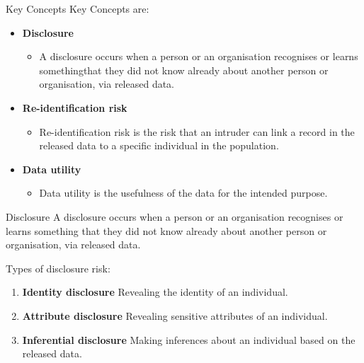 \documentclass[
	11pt, %
]{beamer}
\begin{document}
\begin{frame}{Key Concepts}
\label{key-concepts}
Key Concepts are:

\begin{itemize}
\tightlist
\item
  \textbf{Disclosure}

  \begin{itemize}
  \tightlist
  \item
    A disclosure occurs when a person or an organisation recognises or
    learns somethingthat they did not know already about another person
    or organisation, via released data.
  \end{itemize}
\end{itemize}

\pause

\begin{itemize}
\tightlist
\item
  \textbf{Re-identification risk}

  \begin{itemize}
  \tightlist
  \item
    Re-identification risk is the risk that an intruder can link a
    record in the released data to a specific individual in the
    population.
  \end{itemize}
\end{itemize}

\pause

\begin{itemize}
\tightlist
\item
  \textbf{Data utility}

  \begin{itemize}
  \tightlist
  \item
    Data utility is the usefulness of the data for the intended purpose.
  \end{itemize}
\end{itemize}
\end{frame}

\begin{frame}{Disclosure}
\label{disclosure}
A disclosure occurs when a person or an organisation recognises or
learns something that they did not know already about another person or
organisation, via released data.

Types of disclosure risk:

\begin{enumerate}
[(1)]
\tightlist
\item
  \textbf{Identity disclosure} Revealing the identity of an individual.
  \vspace{0.5cm}
\item
  \textbf{Attribute disclosure} Revealing sensitive attributes of an
  individual. \vspace{0.5cm}
\item
  \textbf{Inferential disclosure} Making inferences about an individual
  based on the released data.
\end{enumerate}
\end{frame}
\end{document}

